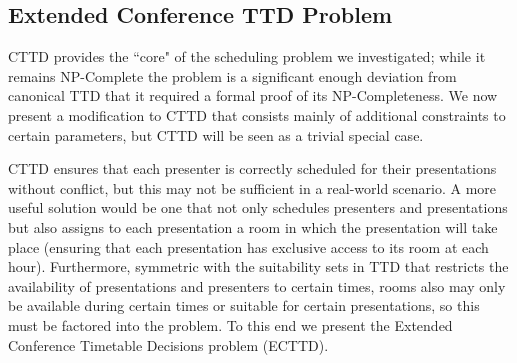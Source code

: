 \documentclass{svjour3}                     %
\begin{document}
\subsection{Extended Conference TTD Problem}
CTTD provides the ``core" of the scheduling problem we investigated; while it remains NP-Complete the problem is a significant enough deviation from canonical TTD that it required a formal proof of its NP-Completeness. We now present a modification to CTTD that consists mainly of additional constraints to certain parameters, but CTTD will be seen as a trivial special case.

CTTD ensures that each presenter is correctly scheduled for their presentations without conflict, but this may not be sufficient in a real-world scenario. A more useful solution would be one that not only schedules presenters and presentations but also assigns to each presentation a room in which the presentation will take place (ensuring that each presentation has exclusive access to its room at each hour). Furthermore, symmetric with the suitability sets in TTD that restricts the availability of presentations and presenters to certain times, rooms also may only be available during certain times or suitable for certain presentations, so this must be factored into the problem. To this end we present the Extended Conference Timetable Decisions problem (ECTTD).
\end{document}
